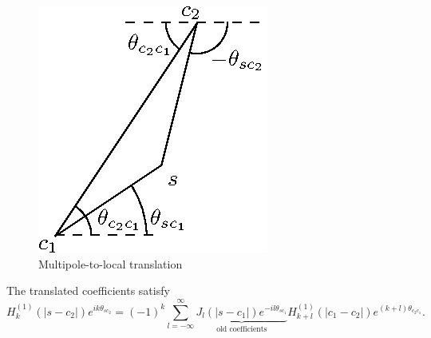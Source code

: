 \documentclass[10pt]{article}
\begin{document}
\begin{figure}[H]
\centering
\includegraphics{media/m2l-translation.eps}
\caption{Multipole-to-local translation}
\end{figure}

The translated coefficients satisfy
%
\[ H_k^{(1)}(|s - c_2|) e^{i k \theta_{sc_2}} = (-1)^k \sum_{l = -\infty}^{\infty}
\underbrace{J_l(|s - c_1|) e^{- i l \theta_{sc_1}}}_{\textrm{old coefficients}}
H_{k + l}^{(1)}(|c_1 - c_2|) e^{(k + l)\theta_{c_2c_1}}. \]
\end{document}
